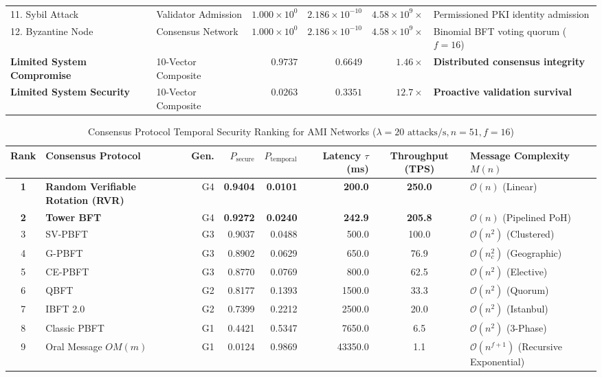 \documentclass[10pt,twocolumn,journal]{IEEEtran}
\begin{document}
\begin{table}[t]
\begin{tabularx}{\textwidth}{@{}lXrrrX@{}}
11. Sybil Attack & Validator Admission & $1.000 \times 10^{0}$ & $2.186 \times 10^{-10}$ & $4.58 \times 10^{9}\times$ & Permissioned PKI identity admission \\
12. Byzantine Node & Consensus Network & $1.000 \times 10^{0}$ & $2.186 \times 10^{-10}$ & $4.58 \times 10^{9}\times$ & Binomial BFT voting quorum ($f=16$) \\
\midrule
\textbf{Limited System Compromise} & 10-Vector Composite & $\mathbf{0.9737}$ & $\mathbf{0.6649}$ & $\mathbf{1.46\times}$ & \textbf{Distributed consensus integrity} \\
\textbf{Limited System Security} & 10-Vector Composite & $\mathbf{0.0263}$ & $\mathbf{0.3351}$ & $\mathbf{12.7\times}$ & \textbf{Proactive validation survival} \\
\bottomrule
\end{tabularx}
\end{table}

\begin{table}[t]
\caption{Consensus Protocol Temporal Security Ranking for AMI Networks ($\lambda = 20\text{ attacks/s}, n=51, f=16$)}
\label{tab:protocol_security}
\centering
\scriptsize
\begin{tabularx}{\textwidth}{@{}clrrrrcX@{}}
\toprule
\textbf{Rank} & \textbf{Consensus Protocol} & \textbf{Gen.} & \textbf{$P_{\text{secure}}$} & \textbf{$P_{\text{temporal}}$} & \textbf{Latency $\tau$ (ms)} & \textbf{Throughput (TPS)} & \textbf{Message Complexity $M(n)$} \\
\midrule
\textbf{1} & \textbf{Random Verifiable Rotation (RVR)} & G4 & \textbf{0.9404} & \textbf{0.0101} & \textbf{200.0} & \textbf{250.0} & $\mathcal{O}(n)$ (Linear) \\
\textbf{2} & \textbf{Tower BFT} & G4 & \textbf{0.9272} & \textbf{0.0240} & \textbf{242.9} & \textbf{205.8} & $\mathcal{O}(n)$ (Pipelined PoH) \\
3 & SV-PBFT & G3 & 0.9037 & 0.0488 & 500.0 & 100.0 & $\mathcal{O}(n^2)$ (Clustered) \\
4 & G-PBFT & G3 & 0.8902 & 0.0629 & 650.0 & 76.9 & $\mathcal{O}(n_c^2)$ (Geographic) \\
5 & CE-PBFT & G3 & 0.8770 & 0.0769 & 800.0 & 62.5 & $\mathcal{O}(n^2)$ (Elective) \\
6 & QBFT & G2 & 0.8177 & 0.1393 & 1500.0 & 33.3 & $\mathcal{O}(n^2)$ (Quorum) \\
7 & IBFT 2.0 & G2 & 0.7399 & 0.2212 & 2500.0 & 20.0 & $\mathcal{O}(n^2)$ (Istanbul) \\
8 & Classic PBFT & G1 & 0.4421 & 0.5347 & 7650.0 & 6.5 & $\mathcal{O}(n^2)$ (3-Phase) \\
9 & Oral Message $OM(m)$ & G1 & 0.0124 & 0.9869 & 43350.0 & 1.1 & $\mathcal{O}(n^{f+1})$ (Recursive Exponential) \\
\bottomrule
\end{tabularx}
\end{table}
\end{document}
